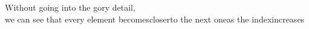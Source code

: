 \documentclass[preview]{standalone}
\begin{document}
\begin{center}
Without going into the gory detail, \\we can see that every element becomescloserto the next oneas the indexincreases
\end{center}
\end{document}
